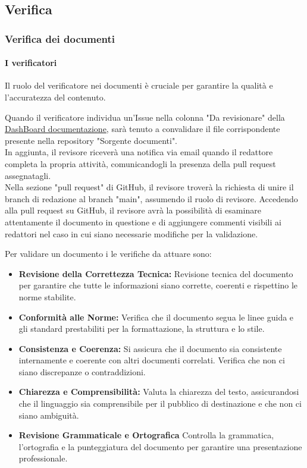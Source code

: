 \documentclass{article}
\begin{document}
\subsection{Verifica}\label{sec:verifica}
\subsubsection{Verifica dei documenti}
\paragraph{I verificatori}\label{sec:verificatori}

Il ruolo del verificatore nei documenti è cruciale per garantire la qualità e l'accuratezza del contenuto.

Quando il verificatore individua un'Issue nella colonna "Da revisionare" della  \href{https://github.com/orgs/ByteOps-swe/projects/1/views/1}{DashBoard documentazione}, sarà tenuto a convalidare il file corrispondente presente nella repository "Sorgente documenti". \\
In aggiunta, il revisore riceverà una notifica via email quando il redattore completa la propria attività, comunicandogli la presenza della pull request assegnatagli.\\
Nella sezione "pull request" di GitHub, il revisore troverà la richiesta di unire il branch di redazione al branch "main", assumendo il ruolo di revisore. Accedendo alla pull request su GitHub, il revisore avrà la possibilità di esaminare attentamente il documento in questione e di aggiungere commenti visibili ai redattori nel caso in cui siano necessarie modifiche per la validazione.

\vspace{0.3cm}

Per validare un documento i le verifiche da attuare sono:
\begin{itemize}
    \item \textbf{Revisione della Correttezza Tecnica:} Revisione tecnica del documento per garantire che tutte le informazioni siano corrette, coerenti e rispettino le norme stabilite.
    \item \textbf{Conformità alle Norme:} Verifica che il documento segua le linee guida e gli standard prestabiliti per la formattazione, la struttura e lo stile.
    \item \textbf{Consistenza e Coerenza:} Si assicura che il documento sia consistente internamente e coerente con altri documenti correlati. Verifica che non ci siano discrepanze o contraddizioni.
    \item \textbf{Chiarezza e Comprensibilità:} Valuta la chiarezza del testo, assicurandosi che il linguaggio sia comprensibile per il pubblico di destinazione e che non ci siano ambiguità.
    \item \textbf{Revisione Grammaticale e Ortografica} Controlla la grammatica, l'ortografia e la punteggiatura del documento per garantire una presentazione professionale.
\end{itemize}
\end{document}
